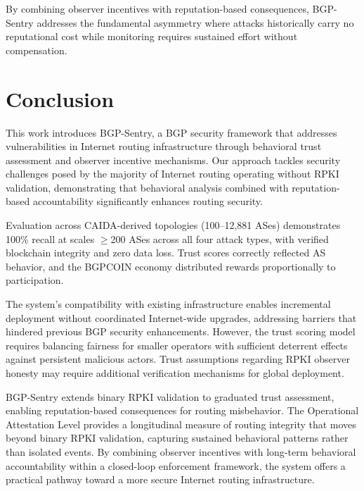 \documentclass[conference]{IEEEtran}
\begin{document}
By combining observer incentives with reputation-based consequences, BGP-Sentry addresses the fundamental asymmetry where attacks historically carry no reputational cost while monitoring requires sustained effort without compensation.



\section{Conclusion}
\label{sec:conclusion}

This work introduces BGP-Sentry, a BGP security framework that addresses vulnerabilities in Internet routing infrastructure through behavioral trust assessment and observer incentive mechanisms. Our approach tackles security challenges posed by the majority of Internet routing operating without RPKI validation, demonstrating that behavioral analysis combined with reputation-based accountability significantly enhances routing security.

Evaluation across CAIDA-derived topologies (100--12{,}881 ASes) demonstrates 100\% recall at scales $\geq$200 ASes across all four attack types, with verified blockchain integrity and zero data loss. Trust scores correctly reflected AS behavior, and the BGPCOIN economy distributed rewards proportionally to participation.

The system's compatibility with existing infrastructure enables incremental deployment without coordinated Internet-wide upgrades, addressing barriers that hindered previous BGP security enhancements. However, the trust scoring model requires balancing fairness for smaller operators with sufficient deterrent effects against persistent malicious actors. Trust assumptions regarding RPKI observer honesty may require additional verification mechanisms for global deployment.

BGP-Sentry extends binary RPKI validation to graduated trust assessment, enabling reputation-based consequences for routing misbehavior. The Operational Attestation Level provides a longitudinal measure of routing integrity that moves beyond binary RPKI validation, capturing sustained behavioral patterns rather than isolated events. By combining observer incentives with long-term behavioral accountability within a closed-loop enforcement framework, the system offers a practical pathway toward a more secure Internet routing infrastructure.





\appendices

\end{document}
